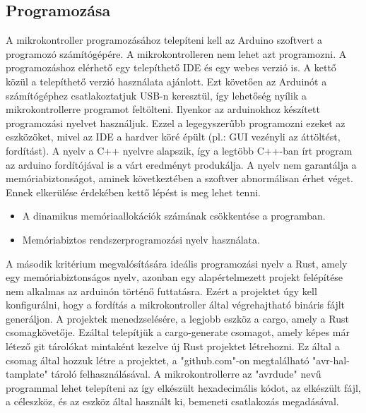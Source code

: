 \subsection{Programozása}
A mikrokontroller programozásához telepíteni kell az Arduino szoftvert a programozó számítógépére.
A mikrokontrolleren nem lehet azt programozni.
A programozáshoz elérhető egy telepíthető IDE és egy webes verzió is.
A kettő közül a telepíthető verzió használata ajánlott.
Ezt követően az Arduinót a számítógéphez csatlakoztatjuk USB-n keresztül, így lehetőség nyílik a mikrokontrollerre programot feltölteni. \cite{monk2023programming}
Ilyenkor az arduinokhoz készített programozási nyelvet használjuk.
Ezzel a legegyszerűbb programozni ezeket az eszközöket, mivel az IDE a hardver köré épült (pl.: GUI vezényli az áttöltést, fordítást).
A nyelv a C++ nyelvre alapszik, így a legtöbb C++-ban írt program az arduino fordítójával is a várt eredményt produkálja.
A nyelv nem garantálja a memóriabiztonságot, aminek következtében a szoftver abnormálisan érhet véget. Ennek elkerülése érdekében kettő lépést is meg lehet tenni.
\begin{itemize}
    \item A dinamikus memóriaallokációk számának csökkentése a programban.
    \item Memóriabiztos rendszerprogramozási nyelv használata.
\end{itemize}
A második kritérium megvalósítására ideális programozási nyelv a Rust, amely egy memóriabiztonságos nyelv, azonban egy alapértelmezett projekt felépítése nem alkalmas az arduinón történő futtatásra. Ezért a projektet úgy kell konfigurálni, hogy a fordítás a mikrokontroller által végrehajtható bináris fájlt generáljon. A projektek menedzselésére, a legjobb eszköz a cargo, amely a Rust csomagkövetője\cite{cargo}. Ezáltal telepítjük a cargo-generate csomagot, amely képes már létező git tárolókat mintaként kezelve új Rust projektet létrehozni\cite{cargo-generate}. Ez által a csomag által hozzuk létre a projektet, a "github.com"-on megtalálható "avr-hal-tamplate"\cite{templates} tároló felhasználásával. A mikrokontrollerre az "avrdude" nevű programmal lehet telepíteni az így elkészült hexadecimális kódot, az elkészült fájl, a céleszköz, és az eszköz által használt ki, bemeneti csatlakozás megadásával.\cite{avrdude}

